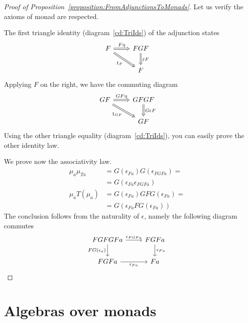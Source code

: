 \begin{proof}[Proof of Proposition~\ref{proposition:FromAdjunctionsToMonads}]
  Let us verify the axioms of monad are respected.

  The first triangle identity (diagram~\eqref{cd:TriIds}) of the
  adjunction states
  \[
    \begin{tikzcd}
      F \ar[r, "{F\eta}", Rightarrow] \ar[dr, "{\id_F}", Rightarrow, swap] & FGF \ar[d,
      "{\varepsilon F}", Rightarrow] \\
      & F
    \end{tikzcd}
  \]
  Applying \(F\) on the right, we have the commuting diagram
  \[
    \begin{tikzcd}
      GF \ar["{GF\eta}", r, Rightarrow] \ar["{\id_{GF}}", dr, swap,
      Rightarrow] & GFGF \ar["{G \epsilon F}", d, Rightarrow] \\
      & GF
    \end{tikzcd}
  \]
  Using the other triangle equality (diagram~\eqref{cd:TriIds}), you can
  easily prove the other identity law.

  We prove now the associativity law.
  \begin{align*}
    \mu_a \mu_{Ta} &= G\left( \epsilon_{Fa} \right) G \left( \epsilon_{FGFa} \right) = \\
               &= G(\epsilon_{Fa} \epsilon_{FGFa}) \\
    \mu_a T(\mu_a) &= G \left( \epsilon_{Fa} \right) GFG \left( \epsilon_{Fa} \right) = \\
               &= G \left( \epsilon_{Fa} FG\left( \epsilon_{Fa} \right) \right)
  \end{align*}
  The conclusion follows from the naturality of \(\epsilon\), namely the
  following diagram commutes
  \[
    \begin{tikzcd}
      FGFGFa \ar["{FG(\epsilon_a)}", d, swap] \ar["{\epsilon_{FGFa}}", r] & FGFa \ar["{\epsilon_{Fa}}", d] \\
      FGFa \ar["{\epsilon_{Fa}}", r, swap] & Fa
    \end{tikzcd}
    \qedhere
  \]
\end{proof}



\section{Algebras over monads}

